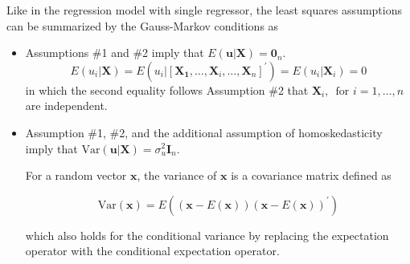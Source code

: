 \documentclass[a4paper,11pt]{article}
\newcommand{\var}{\mathrm{Var}}
\begin{document}
Like in the regression model with single regressor, the least
squares assumptions can be summarized by the Gauss-Markov conditions
as
\begin{itemize}
\item Assumptions \#1 and \#2 imply that \(E(\mathbf{u} | \mathbf{X}) = \mathbf{0}_n\).
\[E(u_i | \mathbf{X}) = E(u_i | [\mathbf{X_1}, \ldots, \mathbf{X}_i,
  \ldots, \mathbf{X}_n]^{\prime}) = E(u_i | \mathbf{X}_i) = 0\]
in  which the second equality follows Assumption \#2 that
\(\mathbf{X}_i,\,\text{ for } i = 1,\ldots,n\) are independent.

\item Assumption \#1, \#2, and the additional assumption of homoskedasticity
imply that \(\var(\mathbf{u} | \mathbf{X}) = \sigma^2_u \mathbf{I}_n\).

For a random vector \(\mathbf{x}\), the variance of \(\mathbf{x}\) is a
covariance matrix defined as
\begin{LaTeX}
\[ \var(\mathbf{x}) =
  E\left((\mathbf{x}-E(\mathbf{x}))(\mathbf{x}-E(\mathbf{x}))^{\prime}\right)
  \]
\end{LaTeX}
which also holds for the conditional variance by replacing the
expectation operator with the conditional expectation operator.


\end{itemize}
\end{document}
